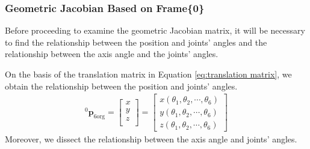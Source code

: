 \subsubsection{Geometric Jacobian Based on Frame\{0\}}
Before proceeding to examine the geometric Jacobian matrix, it will be necessary to find the relationship between the position and joints' angles and the relationship between the axis angle and the joints' angles.
\par\noindent
On the basis of the translation matrix in Equation \ref{eq:translation matrix}, we obtain the relationship between the position and joints' angles.
\begin{equation}
\begin{split}
^0\boldsymbol{p}_\mathrm{6org}
= 
\begin{bmatrix}
x\\
y\\
z\\
\end{bmatrix} 
=
\begin{bmatrix}
x(\theta _1, \theta _2, \cdots, \theta _6)\\
y(\theta _1, \theta _2, \cdots, \theta _6)\\
z(\theta _1, \theta _2, \cdots, \theta _6)
\end{bmatrix} 
\end{split}
\end{equation}\label{eq:lin vel}
Moreover, we dissect the relationship between the axis angle and joints' angles.
